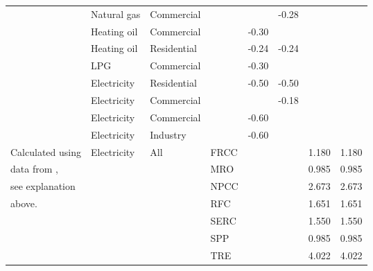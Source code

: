 \begin{ThreePartTable}
\begin{longtable}{ >{\raggedright}p{9em} l l l l l l l }
    \cite{us_energy_information_administration_price_2021}& Natural gas  & Commercial  &      &         & -0.28   &         &        \\
                                                          & Heating oil   & Commercial  &      & -0.30   &         &         &        \\
                                                          & Heating oil   & Residential &      & -0.24   & -0.24   &         &        \\
                                                          & LPG           & Commercial  &      & -0.30\tnote{c}   &         &         &        \\
                                                          & Electricity   & Residential &      & -0.50   & -0.50   &         &        \\
                                                          & Electricity   & Commercial  &      &         & -0.18   &         &        \\
    \cite{burke_price_2018}                              & Electricity   & Commercial  &      & -0.60   &         &         &        \\
    \cite{ros_econometric_2017}                          & Electricity   & Industry    &      & -0.60   &         &         &        \\
    Calculated using                                & Electricity   & All         & FRCC &         &         & 1.180   & 1.180  \\
    data from \cite{deetjen_reduced-order_2019},                                                      &               &             & MRO  &         &         & 0.985   & 0.985  \\
    see explanation                                       &               &             & NPCC &         &         & 2.673   & 2.673  \\
    above.                                                &               &             & RFC  &         &         & 1.651   & 1.651  \\
                                                          &               &             & SERC &         &         & 1.550   & 1.550  \\
                                                          &               &             & SPP  &         &         & 0.985   & 0.985  \\
                                                          &               &             & TRE  &         &         & 4.022   & 4.022  \\

\end{longtable}
\end{ThreePartTable}
